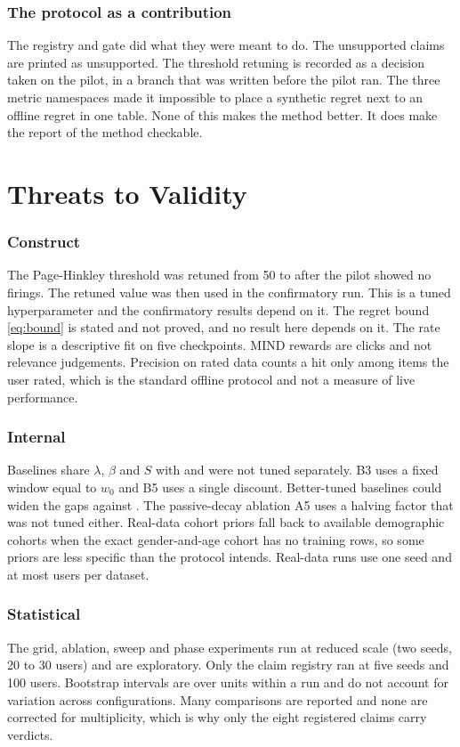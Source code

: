 \subsubsection*{The protocol as a contribution}
The registry and gate did what they were meant to do. The unsupported claims are printed as unsupported. The threshold retuning is recorded as a decision taken on the pilot, in a branch that was written before the pilot ran. The three metric namespaces made it impossible to place a synthetic regret next to an offline regret in one table. None of this makes the method better. It does make the report of the method checkable.

\section{Threats to Validity}
\label{sec:threats}

\subsubsection*{Construct}
The Page-Hinkley threshold was retuned from 50 to \cfgPHThreshold{} after the pilot showed no firings. The retuned value was then used in the confirmatory run. This is a tuned hyperparameter and the confirmatory results depend on it. The regret bound \eqref{eq:bound} is stated and not proved, and no result here depends on it. The rate slope is a descriptive fit on five checkpoints. MIND rewards are clicks and not relevance judgements. Precision on rated data counts a hit only among items the user rated, which is the standard offline protocol and not a measure of live performance.

\subsubsection*{Internal}
Baselines share $\lambda$, $\beta$ and $S$ with \des{} and were not tuned separately. B3 uses a fixed window equal to $w_0$ and B5 uses a single discount. Better-tuned baselines could widen the gaps against \des{}. The passive-decay ablation A5 uses a halving factor that was not tuned either. Real-data cohort priors fall back to available demographic cohorts when the exact gender-and-age cohort has no training rows, so some priors are less specific than the protocol intends. Real-data runs use one seed and at most \mlMaxUsers{} users per dataset.

\subsubsection*{Statistical}
The grid, ablation, sweep and phase experiments run at reduced scale (two seeds, 20 to 30 users) and are exploratory. Only the claim registry ran at five seeds and 100 users. Bootstrap intervals are over units within a run and do not account for variation across configurations. Many comparisons are reported and none are corrected for multiplicity, which is why only the eight registered claims carry verdicts.


